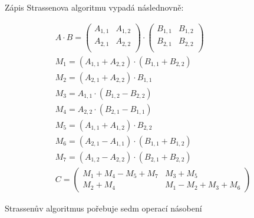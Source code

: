 \documentclass[thesis=B,czech]{FITthesis}[2012/06/26]
\begin{document}
Zápis Strassenova algoritmu vypadá následnovně:	

\begin{align}
A \cdot B = \begin{pmatrix}
 A_{1,1} & A_{1,2} \\
 A_{2,1} & A_{2,2} \\
\end{pmatrix} \cdot \begin{pmatrix}
 B_{1,1} & B_{1,2} \\
 B_{2,1} & B_{2,2} \\
\end{pmatrix} \\
M_{1} = (A_{1,1} + A_{2,2}) \cdot (B_{1,1} + B_{2,2}) \\
M_{2} = (A_{2,1} + A_{2,2}) \cdot B_{1,1} \\
M_{3} = A_{1,1} \cdot (B_{1,2} - B_{2,2}) \\
M_{4} = A_{2,2} \cdot (B_{2,1} - B_{1,1}) \\
M_{5} = (A_{1,1} + A_{1,2}) \cdot B_{2,2} \\
M_{6} = (A_{2,1} - A_{1,1}) \cdot (B_{1,1} + B_{1,2}) \\
M_{7} = (A_{1,2} - A_{2,2}) \cdot (B_{2,1} + B_{2,2}) \\
C = \begin{pmatrix}
 M_{1} + M_{4} - M_{5} + M_{7} & M_{3} + M_{5} \\
 M_{2} + M_{4} & M_{1} - M_{2} + M_{3} + M_{6}
\end{pmatrix}
\end{align}

Strassenův algoritmus pořebuje sedm operací násobení
\end{document}
